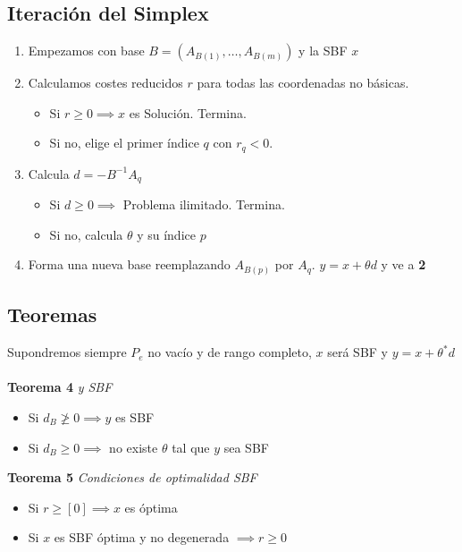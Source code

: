 \documentclass{myclass}
\begin{document}
\subsection{Iteración del Simplex}
\begin{enumerate}
    \item Empezamos con base $B = (A_{B(1)}, \ldots, A_{B(m)})$ y la SBF $x$
    \item Calculamos costes reducidos $r$ para todas las coordenadas no básicas.
    \begin{itemize}
        \item Si $r\geq 0 \implies x$ es Solución. Termina. 
        \item Si no, elige el primer índice $q$ con $r_q<0$. 
    \end{itemize}
    \item Calcula $d = -B^{-1}A_q$
    \begin{itemize}
        \item Si $d\geq 0 \implies $ Problema ilimitado. Termina.
        \item Si no, calcula $\theta$ y su índice $p$
    \end{itemize}
    \item Forma una nueva base reemplazando $A_{B(p)}$ por $A_q$. $y = x + \theta d$ y ve a \textbf{2}
\end{enumerate}

\subsection{Teoremas}
Supondremos siempre $P_e$ no vacío y de rango completo, $x$ será SBF y $y=x+\theta^*d$ \\
\\
\textbf{Teorema 4} \textit{y SBF}
\begin{itemize}
    \item Si $d_B\ngeq0 \implies y$ es SBF
    \item Si $d_B\geq 0 \implies $ no existe $\theta$ tal que $y$ sea SBF
\end{itemize}
\textbf{Teorema 5} \textit{Condiciones de optimalidad SBF}
\begin{itemize}
    \item Si $r\geq [0] \implies x$ es óptima
    \item Si $x$ es SBF óptima y no degenerada $\implies r\geq 0$ 
\end{itemize}
\end{document}
